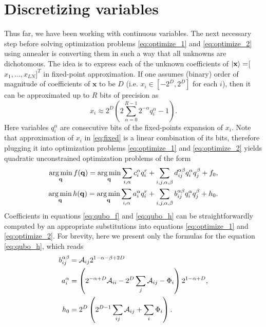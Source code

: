 \section{Discretizing variables}
Thus far, we have been working with continuous variables. The next necessary step before solving optimization problems \eqref{eq:optimize_1} and \eqref{eq:optimize_2} using annealer is converting them in such a way that all unknowns are dichotomous. The idea is to express each of the unknown coefficients of $\ket{\mathbf{x}} = $[$x_1, \ldots, x_{LN}]^T$ in  fixed-point approximation. If one  assumes (binary) order of magnitude of coefficients of $\mathbf x$ to be $D$ (i.e. $x_i \in [-2^D, 2^D]$ for each $i$), then it can be approximated up to $R$ bits of precision as
\begin{equation}
\label{eq:fixed}
    x_i \approx 2^D \left(2 \sum_{\alpha=0}^{R-1}2^{-\alpha}q_i^{\alpha} -1\right).
\end{equation}
Here variables $q_i^\alpha$ are consecutive bits of the fixed-points expansion of $x_i$. Note that approximation of $x_i$ in \eqref{eq:fixed} is a linear combination of its bits, therefore plugging it into optimization problems \eqref{eq:optimize_1} and \eqref{eq:optimize_2} yields
quadratic unconstrained optimization problems of the form
\begin{align}
\label{eq:qubo_f}
\operatorname*{arg\,min}_{\mathbf{q}} f(\mathbf{q}) = \operatorname*{arg\,min}_{\mathbf{q}} \sum_{i,\alpha} c_i^{\alpha} q_i^r + \sum_{i,j,\alpha,\beta} d_{ij}^{\alpha\beta} q_i^{\alpha} q_j^{\beta} + f_0,\\
\label{eq:qubo_h}
\operatorname*{arg\,min}_{\mathbf{q}} h(\mathbf{q}) = \operatorname*{arg\,min}_{\mathbf{q}} \sum_{i,\alpha} a_i^{\alpha} q_i^r + \sum_{i,j,\alpha,\beta} b_{ij}^{\alpha\beta} q_i^{\alpha} q_j^{\beta} + h_0.
\end{align}
Coefficients in equations \eqref{eq:qubo_f} and \eqref{eq:qubo_h} can be straightforwardly computed by an appropriate substitutions into equations \eqref{eq:optimize_1} and \eqref{eq:optimize_2}. For brevity, here we present only the formulas for the equation \eqref{eq:qubo_h}, which reads
\begin{eqnarray}
\begin{split}
b_{ij}^{\alpha\beta} &= \mathcal{A}_{ij} 2^{1-\alpha-\beta+2D} \\
a_i^\alpha &= \left( 2^{-\alpha+D}\mathcal{A}_{ii} - 2^D\sum_{j}\mathcal{A}_{ij}- \Phi_i\right)2^{1-\alpha+D},
\\
h_0 &= 2^D\left( 2^{D-1}\sum_{ij}\mathcal{A}_{ij}+\sum_i \Phi_i\right).
\end{split}
\label{eq:coeff}
\end{eqnarray}

